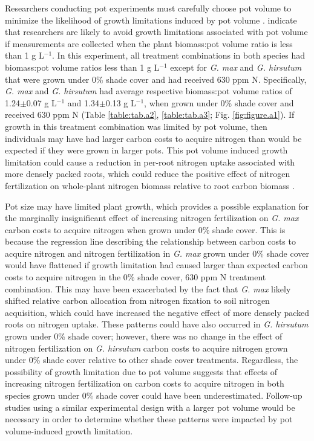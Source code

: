 Researchers conducting pot experiments must carefully choose pot volume to minimize the likelihood of growth limitations induced by pot volume .  indicate that researchers are likely to avoid growth limitations associated with pot volume if measurements are collected when the plant biomass:pot volume ratio is less than 1 g L$^{-1}$. In this experiment, all treatment combinations in both species had biomass:pot volume ratios less than 1 g L$^{-1}$ except for \textit{G. max} and \textit{G. hirsutum} that were grown under 0\% shade cover and had received 630 ppm N. Specifically, \textit{G. max} and \textit{G. hirsutum} had average respective biomass:pot volume ratios of 1.24$\pm$0.07 g L$^{-1}$ and 1.34$\pm$0.13 g L$^{-1}$, when grown under 0\% shade cover and received 630 ppm N (Table \ref{table:tab.a2}, \ref{table:tab.a3}; Fig. \ref{fig:figure.a1}). If growth in this treatment combination was limited by pot volume, then individuals may have had larger carbon costs to acquire nitrogen than would be expected if they were grown in larger pots. This pot volume induced growth limitation could cause a reduction in per-root nitrogen uptake associated with more densely packed roots, which could reduce the positive effect of nitrogen fertilization on whole-plant nitrogen biomass relative to root carbon biomass .

Pot size may have limited plant growth, which provides a possible explanation for the marginally insignificant effect of increasing nitrogen fertilization on \textit{G. max} carbon costs to acquire nitrogen when grown under 0\% shade cover. This is because the regression line describing the relationship between carbon costs to acquire nitrogen and nitrogen fertilization in \textit{G. max} grown under 0\% shade cover would have flattened if growth limitation had caused larger than expected carbon costs to acquire nitrogen in the 0\% shade cover, 630 ppm N treatment combination. This may have been exacerbated by the fact that \textit{G. max} likely shifted relative carbon allocation from nitrogen fixation to soil nitrogen acquisition, which could have increased the negative effect of more densely packed roots on nitrogen uptake. These patterns could have also occurred in \textit{G. hirsutum} grown under 0\% shade cover; however, there was no change in the effect of nitrogen fertilization on \textit{G. hirsutum} carbon costs to acquire nitrogen grown under 0\% shade cover relative to other shade cover treatments. Regardless, the possibility of growth limitation due to pot volume suggests that effects of increasing nitrogen fertilization on carbon costs to acquire nitrogen in both species grown under 0\% shade cover could have been underestimated. Follow-up studies using a similar experimental design with a larger pot volume would be necessary in order to determine whether these patterns were impacted by pot volume-induced growth limitation.


